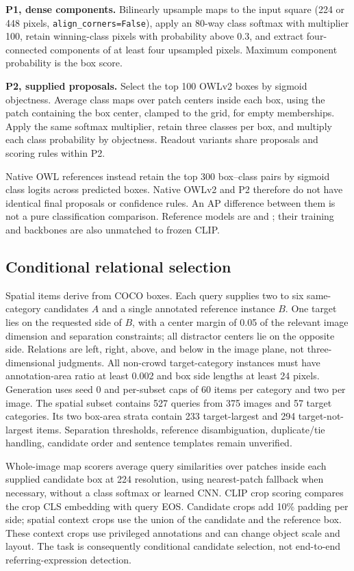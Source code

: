 \documentclass[10pt,twocolumn,letterpaper]{article}
\begin{document}
\textbf{P1, dense components.} Bilinearly upsample maps to the input
square (224 or 448 pixels, \texttt{align\_corners=False}), apply an
80-way class softmax with multiplier 100, retain winning-class pixels
with probability above 0.3, and extract four-connected components of at
least four upsampled pixels. Maximum component probability is the box
score.

\textbf{P2, supplied proposals.} Select the top 100 OWLv2 boxes by
sigmoid objectness. Average class maps over patch centers inside each
box, using the patch containing the box center, clamped to the grid, for
empty memberships. Apply the same softmax multiplier, retain three
classes per box, and multiply each class probability by objectness.
Readout variants share proposals and scoring rules within P2.

Native OWL references instead retain the top 300 box--class pairs by
sigmoid class logits across predicted boxes. Native OWLv2 and P2
therefore do not have identical final proposals or confidence rules. An
AP difference between them is not a pure classification comparison.
Reference models are  and
; their training and
backbones are also unmatched to frozen CLIP.

\subsection{Conditional relational
selection}\label{conditional-relational-selection}

Spatial items derive from COCO boxes. Each query supplies two to six
same-category candidates \(A\) and a single annotated reference instance
\(B\). One target lies on the requested side of \(B\), with a center
margin of 0.05 of the relevant image dimension and separation
constraints; all distractor centers lie on the opposite side. Relations
are left, right, above, and below in the image plane, not
three-dimensional judgments. All non-crowd target-category instances
must have annotation-area ratio at least 0.002 and box side lengths at
least 24 pixels. Generation uses seed 0 and per-subset caps of 60 items
per category and two per image. The spatial subset contains 527 queries
from 375 images and 57 target categories. Its two box-area strata
contain 233 target-largest and 294 target-not-largest items. Separation
thresholds, reference disambiguation, duplicate/tie handling, candidate
order and sentence templates remain unverified.

Whole-image map scorers average query similarities over patches inside
each supplied candidate box at 224 resolution, using nearest-patch
fallback when necessary, without a class softmax or learned CNN. CLIP
crop scoring compares the crop CLS embedding with query EOS. Candidate
crops add 10\% padding per side; spatial context crops use the union of
the candidate and the reference box. These context crops use privileged
annotations and can change object scale and layout. The task is
consequently conditional candidate selection, not end-to-end
referring-expression detection.
\end{document}
